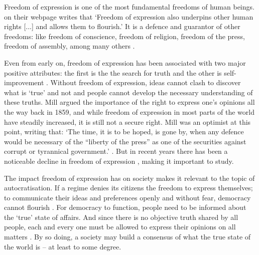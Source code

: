 Freedom of expression is one of the most fundamental freedoms of human beings. \citet{amnesty_international_freedom_2023} on their webpage writes that `Freedom of expression also underpins other human rights [...] and allows them to flourish.'  It is a defence and guarantor of other freedoms: like freedom of conscience, freedom of religion, freedom of the press, freedom of assembly, among many others \citep{amnesty_international_freedom_2023}.

Even from early on, freedom of expression has been associated with two major positive attributes: the first is the the search for truth and the other is self-improvement \citep[pp. 25-80]{mill_liberty_2010}. Without freedom of expression, ideas cannot clash to discover what is `true' and not and people cannot develop the necessary understanding of these truths. Mill argued the importance of the right to express one's opinions all the way back in 1859, and while freedom of expression in most parts of the world have steadily increased, it is still not a secure right. Mill was an optimist at this point, writing that: `The time, it is to be hoped, is gone by, when any defence would be necessary of the ``liberty of the press'' as one of the securities against corrupt or tyrannical government.' \citep[p. 25]{mill_liberty_2010}. But in recent years there has been a noticeable decline in freedom of expression \citep[p. 17]{nord_democracy_2025}, making it important to study. 

The impact freedom of expression has on society makes it relevant to the topic of autocratisation. If a regime denies its citizens the freedom to express themselves; to communicate their ideas and preferences openly and without fear, democracy cannot flourish \citep{bhagwat_freedom_2021}. For democracy to function, people need to be informed about the `true' state of affairs. And since there is no objective truth shared by all people, each and every one must be allowed to express their opinions on all matters \citep{mill_liberty_2010}. By so doing, a society may build a consensus of what the true state of the world is -- at least to some degree. 

